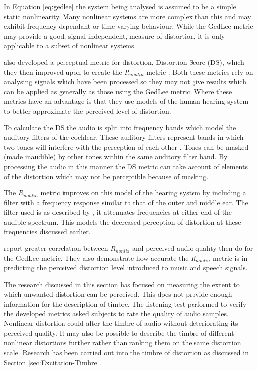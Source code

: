 		In Equation \ref{eq:gedlee} the system being analysed is assumed to be a simple static nonlinearity. Many
		nonlinear systems are more complex than this and may exhibit frequency dependant or time varying behaviour.
		While the GedLee metric may provide a good, signal independent, measure of distortion, it is only applicable
		to a subset of nonlinear systems.

		\citet{tan2003the} also developed a perceptual metric for distortion, Distortion Score (DS), which they then
		improved upon to create the $R_{nonlin}$ metric \citep{tan2004predicting}. Both these metrics rely on
		analysing signals which have been processed so they may not give results which can be applied as generally
		as those using the GedLee metric. Where these metrics have an advantage is that they use models of the human
		hearing system to better approximate the perceived level of distortion.

		To calculate the DS the audio is split into frequency bands which model the auditory filters of the
		cochlear. These auditory filters represent bands in which two tones will interfere with the perception of
		each other \citep{fastl2007psychoacoustics}. Tones can be masked (made inaudible) by other tones within the
		same auditory filter band. By processing the audio in this manner the DS metric can take account of elements
		of the distortion which may not be perceptible because of masking.
		
		The $R_{nonlin}$ metric improves on this model of the hearing system by including a filter with a frequency
		response similar to that of the outer and middle ear. The filter used is as described by
		\citet{glasberg2002a}, it attenuates frequencies at either end of the audible spectrum. This models the
		decreased perception of distortion at these frequencies discussed earlier.

		\citet{tan2004predicting} report greater correlation between $R_{nonlin}$ and perceived audio quality then
		\citet{lee2003auditory} do for the GedLee metric. They also demonstrate how accurate the $R_{nonlin}$ metric
		is in predicting the perceived distortion level introduced to music and speech signals.

		The research discussed in this section has focused on measuring the extent to which unwanted distortion can
		be perceived. This does not provide enough information for the description of timbre. The listening test
		performed to verify the developed metrics asked subjects to rate the quality of audio samples. Nonlinear
		distortion could alter the timbre of audio without deteriorating its perceived quality. It may also be
		possible to describe the timbre of different nonlinear distortions further rather than ranking them on the
		same distortion scale. Research has been carried out into the timbre of distortion as discussed in Section
		\ref{sec:Excitation-Timbre}.

